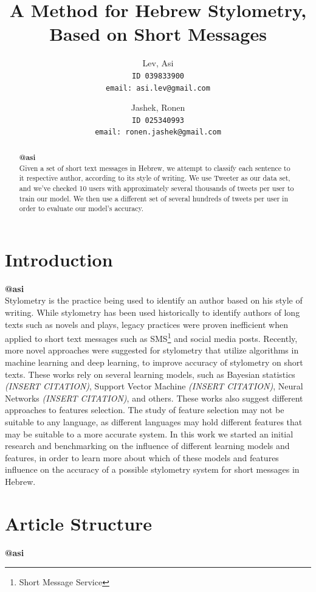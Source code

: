 \documentclass[a4paper]{article}
\author{Lev, Asi\\
	\texttt{ID 039833900}\\
	\texttt{email: asi.lev@gmail.com}
\and
	Jashek, Ronen\\
	\texttt{ID 025340993}\\
	\texttt{email: ronen.jashek@gmail.com}	
}
\title{A Method for Hebrew Stylometry, Based on Short Messages}
\date{}
\begin{document}
\maketitle
\begin{abstract}
\textbf{@asi}\\

Given a set of short text messages in Hebrew, we attempt to classify each sentence to it respective author, according to its style of writing.
We use Tweeter as our data set, and we've checked 10 users with approximately several thousands of tweets per user to train our model.
We then use a different set of several hundreds of tweets per user in order to evaluate our model's accuracy.
\end{abstract}
\section{Introduction}
\textbf{@asi}\\
Stylometry is the practice being used to identify an author based on his style of writing.
While stylometry has been used historically to identify authors of long texts such as novels and plays, legacy practices were proven inefficient when applied to short text messages such as SMS\footnote{Short Message Service} and social media posts.
Recently, more novel approaches were suggested for stylometry that utilize algorithms in machine learning and deep learning, to improve accuracy of stylometry on short texts.
These works rely on several learning models, such as Bayesian statistics \emph{(INSERT CITATION)}, Support Vector Machine \emph{(INSERT CITATION)}, Neural Networks \emph{(INSERT CITATION)}, and others.
These works also suggest different approaches to features selection. The study of feature selection may not be suitable to any language, as different languages may hold different features that may be suitable to a more accurate system.
In this work we started an initial research and benchmarking on the influence of different learning models and features, in order to learn more about which of these models and features influence on the accuracy of a possible stylometry system for short messages in Hebrew.
\section{Article Structure}
\textbf{@asi}\\
\end{document}
